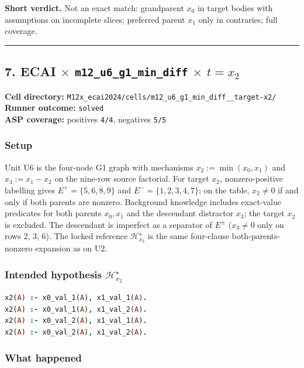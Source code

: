 \documentclass[11pt]{article}
\begin{document}
\textbf{Short verdict.} Not an exact match: grandparent \(x_0\) in target bodies with assumptions on incomplete slices; preferred parent \(x_1\) only in contraries; full coverage.

\medskip\hrule\medskip

\subsection{\texorpdfstring{7. ECAI \(\times\) \texttt{m12\_u6\_g1\_min\_diff} \(\times\) \(t=x_2\)}{7. ECAI - m12-u6-g1-min-diff - target x2}}

\textbf{Cell directory:} \texttt{M12x\_ecai2024/cells/m12\_u6\_g1\_min\_diff\_\_target-x2/}\\
\textbf{Runner outcome:} \texttt{solved}\\
\textbf{ASP coverage:} positives \texttt{4/4}, negatives \texttt{5/5}

\subsubsection{Setup}

Unit U6 is the four-node G1 graph with mechanisms \(x_2:=\min(x_0,x_1)\) and \(x_3:=x_1-x_2\) on the nine-row source factorial. For target \(x_2\), nonzero-positive labelling gives \(E^+=\{5,6,8,9\}\) and \(E^-=\{1,2,3,4,7\}\); on the table, \(x_2\neq 0\) if and only if both parents are nonzero. Background knowledge includes exact-value predicates for both parents \(x_0,x_1\) and the descendant distractor \(x_3\); the target \(x_2\) is excluded. The descendant is imperfect as a separator of \(E^\pm\) (\(x_3\neq 0\) only on rows 2, 3, 6). The locked reference \(\mathcal{H}_{x_2}^\star\) is the same four-clause both-parents-nonzero expansion as on U2.

\subsubsection{\texorpdfstring{Intended hypothesis \(\mathcal{H}_{x_2}^\star\)}{Intended hypothesis H-star(x2)}}

\begin{lstlisting}[style=logic,language=Prolog]
x2(A) :- x0_val_1(A), x1_val_1(A).
x2(A) :- x0_val_1(A), x1_val_2(A).
x2(A) :- x0_val_2(A), x1_val_1(A).
x2(A) :- x0_val_2(A), x1_val_2(A).
\end{lstlisting}

\subsubsection{What happened}
\end{document}
